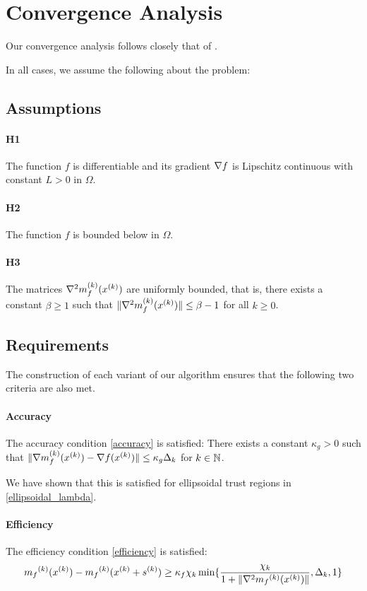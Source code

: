 \section{Convergence Analysis}

Our convergence analysis follows closely that of \cite{Conejo:2013:GCT:2620806.2621814}.


In all cases, we assume the following about the problem:
\subsection{Assumptions}
\paragraph{H1}
The function $f$ is differentiable and its gradient $\nabla f$ is Lipschitz continuous with constant $L > 0$ in $ \Omega $.
\paragraph{H2}
The function $f$ is bounded below in $ \Omega $.
\paragraph{H3}
The matrices ${\nabla^2m_f^{(k)}(x^{(k)})}$ are uniformly bounded, that is, there exists a constant $ \beta \ge 1 $ such that $\|{\nabla^2m_f^{(k)}(x^{(k)})}\| \le \beta - 1$ for all $k \ge 0$.

\subsection{Requirements}

The construction of each variant of our algorithm ensures that the following two criteria are also met.
\paragraph{Accuracy}
The accuracy condition \ref{accuracy} is satisfied:
There exists a constant $\kappa_{g} > 0$ such that $ \| {\nabla m_f^{(k)}(x^{(k)})} - \nabla f({x}^{(k)}) \| \le \kappa_{g} \Delta_k $ for $k \in \mathbb N $.

We have shown that this is satisfied for ellipsoidal trust regions in \ref{ellipsoidal_lambda}.

\paragraph{Efficiency}

The efficiency condition \ref{efficiency} is satisfied:
\begin{equation}
{{m}_f}^{(k)}({x}^{(k)}) - {{m}_f}^{(k)}({x}^{(k)} + {{s}^{(k)}}) \ge \kappa_f \chi_k \min\{ \frac{\chi_k}{1+\|\nabla^2 {{m}_f}^{(k)}({x}^{(k)})\|}, \Delta_k, 1 \}
\end{equation}


